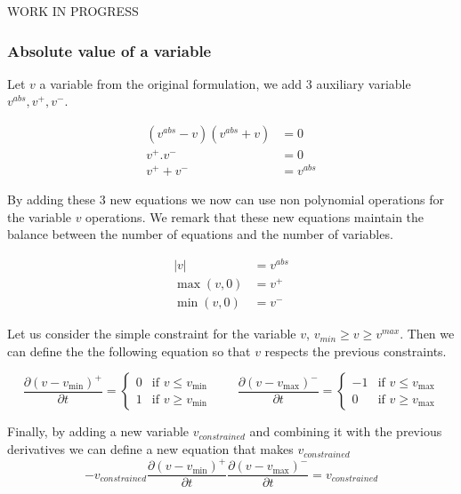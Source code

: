 \documentclass{article}
\begin{document}
WORK IN PROGRESS

\subsubsection*{Absolute value of a variable}

Let $v$ a variable from the original formulation, 
we add 3 auxiliary variable $v^{abs}, v^+, v^-$.

\begin{align}
    (v^{abs} -v) (v^{abs} + v) &= 0 \\
    v^+ . v^- &= 0 \\
    v^+ + v^- &= v^{abs} 
\end{align}

By adding these $3$ new equations we now can use non
polynomial operations for the variable $v$ operations.
We remark that these new equations maintain the balance
between the number of equations and the number of variables.

\begin{align}
    |v| &= v^{abs}\\
    \max(v, 0) &= v^+ \\
    \min(v, 0) &= v^- 
\end{align}

Let us consider the simple constraint for the 
variable $v$, $v _{min} \geq v \geq v^{max}$.
Then we can define the the following equation so that
$v$ respects the previous constraints.

\begin{equation}
    \frac{\partial (v - v_{\min})^+}{\partial t} = \begin{cases}
        0 & \text{if } v \leq v_{\min} \\
        1 & \text{if } v \geq v_{\min}
    \end{cases}
    \qquad
    \frac{\partial (v - v_{\max})^-}{\partial t} = \begin{cases}
        -1 & \text{if } v \leq v_{\max} \\
        0 & \text{if } v \geq v_{\max}
    \end{cases}
\end{equation}

Finally, by adding a new  variable $v_{constrained}$ and combining it
with the previous derivatives we can define a new equation that makes
$v_{constrained}$ 
\begin{equation}
    -v_{constrained} \frac{\partial (v - v_{\min})^+}{\partial t}
    \frac{\partial (v - v_{\max})^-}{\partial t} = v_{constrained}
\end{equation}
\end{document}
